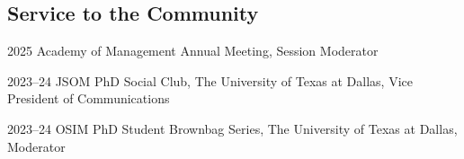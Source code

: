 \documentclass[12pt,letterpaper]{report} %
\begin{document}
   \subsection*{Service to the Community}

   \begin{tablist}
   
       \item[2025]\tab{}Academy of Management Annual Meeting, Session Moderator
       \item[2023--24]\tab{}JSOM PhD Social Club, The University of Texas at Dallas, Vice President of Communications
       \item[2023--24]\tab{}OSIM PhD Student Brownbag Series, The University of Texas at Dallas, Moderator
       
   \end{tablist}








\end{document}
